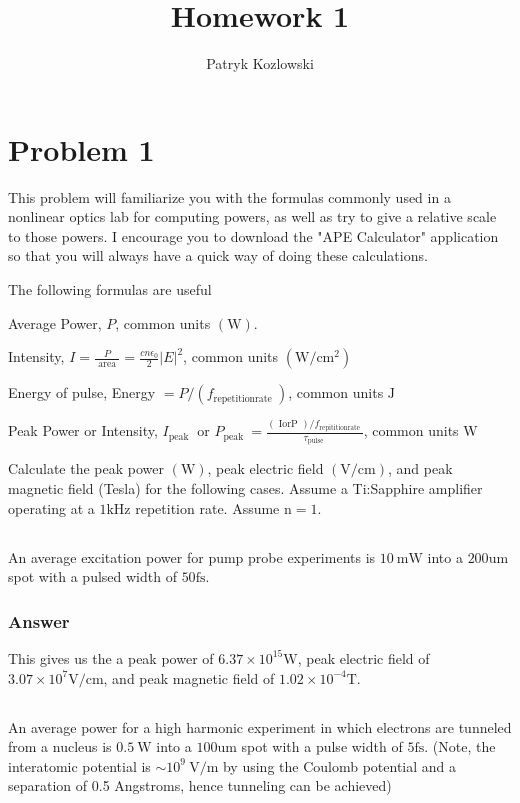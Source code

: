 \documentclass[12pt]{article}
\title{Homework 1}
\author{Patryk Kozlowski}
\begin{document}
\maketitle
\section{Problem 1}
This problem will familiarize you with the formulas commonly used in a nonlinear optics lab for computing powers, as well as try to give a relative scale to those powers. I encourage you to download the "APE Calculator" application so that you will always have a quick way of doing these calculations.

The following formulas are useful

Average Power, $P$, common units $(\mathrm{W})$.

Intensity, $I=\frac{P}{\text { area }}=\frac{c n \epsilon_{0}}{2}|E|^{2}$, common units $\left(\mathrm{W} / \mathrm{cm}^{2}\right)$

Energy of pulse, Energy $=P /\left(f_{\text {repetitionrate }}\right)$, common units $\mathrm{J}$

Peak Power or Intensity, $I_{\text {peak }}$ or $P_{\text {peak }}=\frac{(\text { IorP }) / f_{\text {repititionrate }}}{\tau_{\text {pulse }}}$, common units W

Calculate the peak power $(\mathrm{W})$, peak electric field $(\mathrm{V} / \mathrm{cm})$, and peak magnetic field (Tesla) for the following cases. Assume a Ti:Sapphire amplifier operating at a $1 \mathrm{kHz}$ repetition rate. Assume $\mathrm{n}=1$.

\subsection{}
An average excitation power for pump probe experiments is $10 \mathrm{~mW}$ into a $200 \mathrm{um}$ spot with a pulsed width of $50 \mathrm{fs}$.
\subsubsection{Answer}
This gives us the a peak power of $6.37 \times 10^{15} \mathrm{W}$, peak electric field of $3.07 \times 10^{7} \mathrm{V} / \mathrm{cm}$, and peak magnetic field of $1.02 \times 10^{-4} \mathrm{T}$.

\subsection{}
An average power for a high harmonic experiment in which electrons are tunneled from a nucleus is $0.5 \mathrm{~W}$ into a $100 \mathrm{um}$ spot with a pulse width of $5 \mathrm{fs}$. (Note, the interatomic potential is $\sim 10^{9} \mathrm{~V} / \mathrm{m}$ by using the Coulomb potential and a separation of 0.5 Angstroms, hence tunneling can be achieved)
\end{document}
